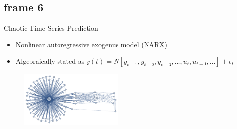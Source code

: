\documentclass[xcolor=x11names,compress]{beamer}
\renewcommand{\(}{\begin{columns}}
\renewcommand{\)}{\end{columns}}
\newcommand{\<}[1]{\begin{column}{#1}}
\renewcommand{\>}{\end{column}}
\begin{document}

\subsection{frame 6}
\begin{frame}{Chaotic Time-Series Prediction}
\begin{itemize}
\item Nonlinear autoregressive exogenus model (NARX)
\item Algebraically stated as $y(t)  = N[y_{t-1}, y_{t-2}, y_{t-3},\dots,u_{t},u_{t-1}, \dots] +\epsilon_{t}$
\end{itemize}
\begin{figure}[h]
   \centering
   \includegraphics[width=2in]{narx.pdf}
   \label{fig:example}
\end{figure}
\end{frame}

\end{document}
